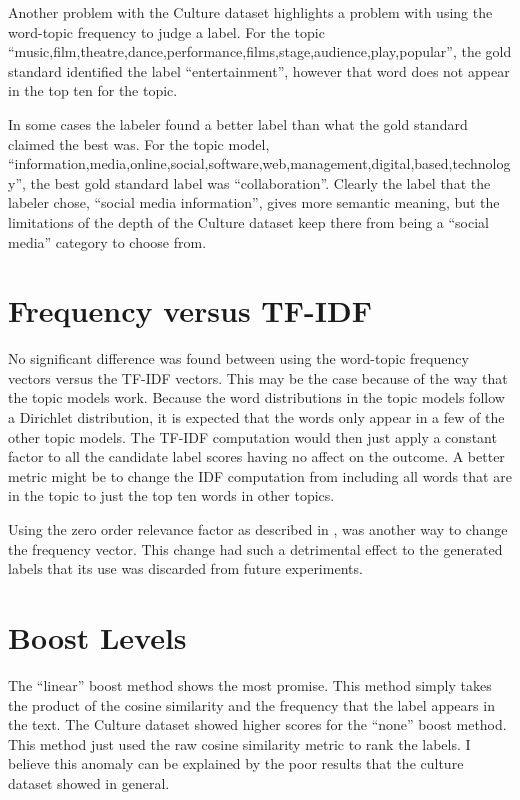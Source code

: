 Another problem with the Culture dataset highlights a problem with using the word-topic frequency to judge a label.  For the topic ``music,film,theatre,dance,performance,films,stage,audience,play,popular'', the gold standard identified the label ``entertainment'', however that word does not appear in the top ten for the topic.

In some cases the labeler found a better label than what the gold standard claimed the best was.  For the topic model, ``information,media,online,social,software,web,management,digital,based,technology'', the best gold standard label was ``collaboration''.  Clearly the label that the labeler chose, ``social media information'', gives more semantic meaning, but the limitations of the depth of the Culture dataset keep there from being a  ``social media'' category to choose from.

\section{Frequency versus TF-IDF}

No significant difference was found between using the word-topic frequency vectors versus the TF-IDF vectors.  This may be the case because of the way that the topic models work.  Because the word distributions in the topic models follow a Dirichlet distribution, it is expected that the words only appear in a few of the other topic models.  The TF-IDF computation would then just apply a constant factor to all the candidate label scores having no affect on the outcome.  A better metric might be to change the IDF computation from including all words that are in the topic to just the top ten words in other topics.

Using the zero order relevance factor as described in \cite{mei2007automatic}, was another way to change the frequency vector.  This change had such a detrimental effect to the generated labels that its use was discarded from future experiments.

\section{Boost Levels}

The ``linear'' boost method shows the most promise.  This method simply takes the product of the cosine similarity and the frequency that the label appears in the text.  The Culture dataset showed higher scores for the ``none'' boost method.  This method just used the raw cosine similarity metric to rank the labels.  I believe this anomaly can be explained by the poor results that the culture dataset showed in general.

